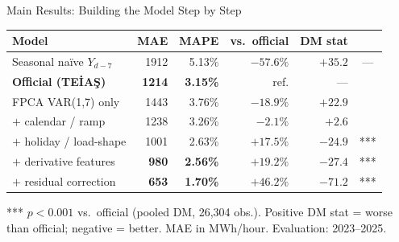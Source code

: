 \documentclass[10pt,aspectratio=169]{beamer}
\begin{document}
\begin{frame}{Main Results: Building the Model Step by Step}
  \begin{center}
  \small
  \begin{tabular}{p{}rrrrc}
    \toprule
    Model & MAE & MAPE & vs.\ official & DM stat & \\
    \midrule
    Seasonal na\"{i}ve $Y_{d-7}$  & 1912 & 5.13\% & $-57.6\%$ & $+35.2$ & --- \\
    \textbf{Official (TEİAŞ)}     & \textbf{1214} & \textbf{3.15\%}
                                   & ref. & --- & \\
    \midrule
    FPCA VAR(1,7) only            & 1443 & 3.76\% & $-18.9\%$ & $+22.9$ & \\
    $+$ calendar / ramp           & 1238 & 3.26\% & $-2.1\%$  & $+2.6$  & \\
    \rowcolor{wingreen}
    $+$ holiday / load-shape      & 1001 & 2.63\% & $+17.5\%$ & $-24.9$ & *** \\
    \rowcolor{wingreen}
    $+$ derivative features       & \textbf{980} & \textbf{2.56\%}
                                   & $+19.2\%$ & $-27.4$ & *** \\
    \midrule
    \rowcolor{wingreen}
    $+$ residual correction       & \textbf{653} & \textbf{1.70\%}
                                   & $+46.2\%$ & $-71.2$ & *** \\
    \bottomrule
  \end{tabular}
  \end{center}
  \vspace{0.1em}
  \footnotesize
  *** $p<0.001$ vs.\ official (pooled DM, 26,304 obs.).
  Positive DM stat = worse than official; negative = better.
  MAE in MWh/hour. Evaluation: 2023--2025.
\end{frame}
\end{document}
